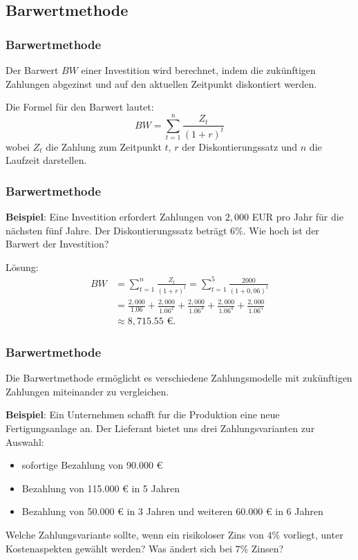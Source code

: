 \documentclass{beamer}
\begin{document}
\subsection{Barwertmethode}
\begin{frame}
  \frametitle{Barwertmethode}
  Der Barwert $BW$ einer Investition wird berechnet, indem die zukünftigen Zahlungen abgezinst und auf den aktuellen Zeitpunkt diskontiert werden.
  
  \vspace{0.3cm}
  
  Die Formel für den Barwert lautet: $$BW = \sum_{t=1}^{n} \frac{Z_t}{(1+r)^t}$$ 
  wobei $Z_t$ die Zahlung zum Zeitpunkt $t$, $r$ der Diskontierungssatz und $n$ die Laufzeit darstellen.
  

\end{frame}


\begin{frame}
  \frametitle{Barwertmethode}
  
  \textbf{Beispiel}: Eine Investition erfordert Zahlungen von $2,000$ EUR pro Jahr für die nächsten fünf Jahre. Der Diskontierungssatz beträgt $6\%$. Wie hoch ist der Barwert der Investition?
  
  \vspace{0.3cm}
  
  Lösung:
  \begin{align*}
    BW &= \sum_{t=1}^{n} \frac{Z_t}{(1+r)^t} = \sum_{t=1}^{5} \frac{2000}{(1+0,06)^t}\\
    &= \frac{2,000}{1.06} + \frac{2,000}{1.06^2} + \frac{2,000}{1.06^3} + \frac{2,000}{1.06^4} + \frac{2,000}{1.06^5}\\  
    &\approx 8,715.55 \text{ €.}  
  \end{align*}
\end{frame}

\begin{frame}
    \frametitle{Barwertmethode}
    Die Barwertmethode ermöglicht es verschiedene Zahlungsmodelle mit zukünftigen Zahlungen miteinander zu vergleichen.

    \textbf{Beispiel}: Ein Unternehmen schafft fur die Produktion eine neue Fertigungsanlage an. Der
    Lieferant bietet uns drei Zahlungsvarianten zur Auswahl:
    \begin{itemize}
        \item sofortige Bezahlung von 90.000 €
        \item Bezahlung von 115.000 € in 5 Jahren
        \item Bezahlung von 50.000 € in 3 Jahren und weiteren 60.000 € in 6 Jahren
    \end{itemize}
    Welche Zahlungsvariante sollte, wenn ein risikoloser Zins von $4\%$ vorliegt, unter Kostenaspekten gewählt werden? Was ändert sich bei $7\%$ Zinsen?
\end{frame}
\end{document}
